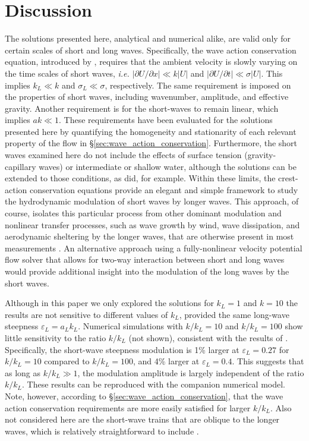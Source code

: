 \documentclass[lineno]{jfm}
\begin{document}
\section{Discussion}
\label{section:discussion}

The solutions presented here, analytical and numerical alike, are valid only
for certain scales of short and long waves.
Specifically, the wave action conservation equation, introduced by
\citet{bretherton1968wavetrains}, requires that the ambient velocity is slowly
varying on the time scales of short waves, \textit{i.e.}
$|\partial U / \partial x| \ll k |U|$
and $|\partial U / \partial t| \ll \sigma |U|$.
This implies $k_L \ll k$ and $\sigma_L \ll \sigma$, respectively.
The same requirement is imposed on the properties of short waves, including
wavenumber, amplitude, and effective gravity.
Another requirement is for the short-waves to remain linear, which implies
$a k \ll 1$.
These requirements have been evaluated for the solutions presented here by
quantifying the homogeneity and stationarity of each relevant property of the
flow in \S\ref{sec:wave_action_conservation}.
Furthermore, the short waves examined here do not include the effects of
surface tension (gravity-capillary waves) or intermediate or shallow water,
although the solutions can be extended to those conditions, as
\citet{phillips1981dispersion} did, for example.
Within these limits, the crest-action conservation equations provide an
elegant and simple framework to study the hydrodynamic modulation
of short waves by longer waves.
This approach, of course, isolates this particular process from other
dominant modulation and nonlinear transfer processes, such as wave growth
by wind, wave dissipation, and aerodynamic sheltering by the longer waves,
that are otherwise present in most measurements
\citep[e.g.,][]{plant1986two,laxague2017gravity}.
An alternative approach using a fully-nonlinear velocity potential flow solver
that allows for two-way interaction between short and long waves would provide
additional insight into the modulation of the long waves by the short waves.

Although in this paper we only explored the solutions for $k_L = 1$ and $k=10$
the results are not sensitive to different values of $k_L$, provided the same
long-wave steepness $\varepsilon_L = a_L k_L$.
Numerical simulations with $k/k_L = 10$ and $k/k_L = 100$ show little
sensitivity to the ratio $k/k_L$ (not shown), consistent with the results of
\citet{longuet1987propagation}.
Specifically, the short-wave steepness modulation is 1\% larger at
$\varepsilon_L = 0.27$ for $k/k_L = 10$ compared to $k/k_L = 100$, and 4\%
larger at $\varepsilon_L = 0.4$.
This suggests that as long as $k/k_L \gg 1$, the modulation amplitude is
largely independent of the ratio $k/k_L$.
These results can be reproduced with the companion numerical model.
Note, however, according to \S\ref{sec:wave_action_conservation}, that the
wave action conservation requirements are more easily satisfied for larger
$k/k_L$.
Also not considered here are the short-wave trains that are oblique to the
longer waves, which is relatively straightforward to include
\citep{peureux2021unsteady}.
\end{document}
